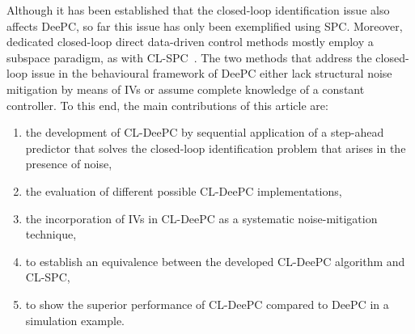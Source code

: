 Although it has been established that the closed-loop identification issue also affects \ac{DeePC}, so far this issue has only been exemplified using \ac{SPC}. Moreover, dedicated closed-loop direct data-driven control methods mostly employ a subspace paradigm, as with \ac{CL-SPC}~\citep{Dong2008}. The two methods that address the closed-loop issue in the behavioural framework of \ac{DeePC} either lack structural noise mitigation by means of \ac{IVs} or assume complete knowledge of a constant controller. To this end, the main contributions of this article are: 
\begin{enumerate}%
\item the development of \ac{CL-DeePC} by sequential application of a step-ahead predictor that solves the closed-loop identification problem that arises in the presence of noise, \label{contribution:solves_CL_issue}
\item the evaluation of different possible \ac{CL-DeePC} implementations,
\item the incorporation of \ac{IVs} in \ac{CL-DeePC} as a systematic noise-mitigation technique,
\item to establish an equivalence between the developed \ac{CL-DeePC} algorithm and \ac{CL-SPC},
\item to show the superior performance of \ac{CL-DeePC} compared to \ac{DeePC} in a simulation example.
\end{enumerate}
% 
